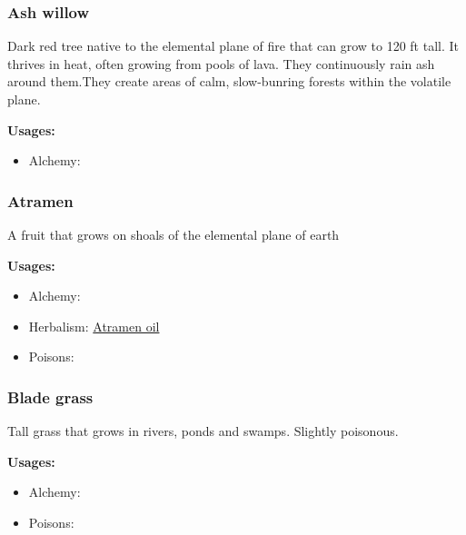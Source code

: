\subsubsection{Ash willow}
\label{Ash willow}

Dark red tree native to the elemental plane of fire that can grow to 120 ft tall. It thrives in heat, often growing from pools of lava. They continuously rain ash around them.They create areas of calm, slow-bunring forests within the volatile plane.

\vspace{5mm}

\textbf{Usages:}

\begin{itemize}[noitemsep]
\item[] Alchemy: \fire\fire\fire
\end{itemize}

\subsubsection{Atramen}
\label{Atramen}

A fruit that grows on shoals of the elemental plane of earth

\vspace{5mm}

\textbf{Usages:}

\begin{itemize}[noitemsep]
\item[] Alchemy: \earth\earth
\item[] Herbalism: \hyperref[Atramen oil]{Atramen oil}
\item[] Poisons: \poison
\end{itemize}

\subsubsection{Blade grass}
\label{Blade grass}

Tall grass that grows in rivers, ponds and swamps. Slightly poisonous.

\vspace{5mm}

\textbf{Usages:}

\begin{itemize}[noitemsep]
\item[] Alchemy: \air\earth\water
\item[] Poisons: \poison
\end{itemize}

